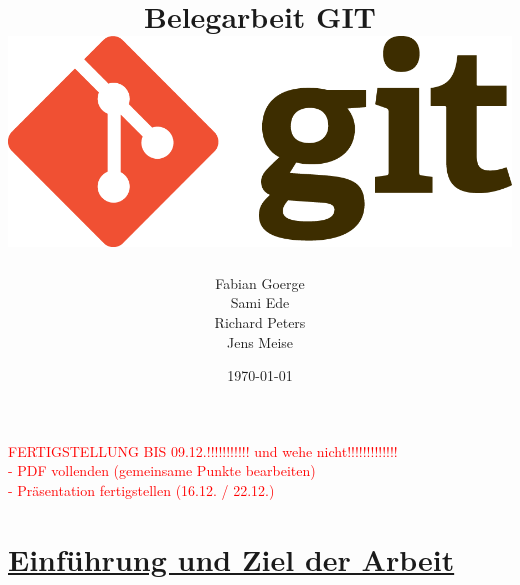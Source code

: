 \documentclass[a4paper]{article}
\begin{document}
\title{\textbf{{\Huge { Belegarbeit GIT \vspace{2cm}} 
\includegraphics[width=\textwidth]{git-logo.png} %
\vspace{2cm} }}}
\author{Fabian Goerge \\  Sami Ede  \\ Richard Peters \\ Jens Meise}
\date{\today}
\maketitle
\thispagestyle{empty} %


\newpage

\setcounter{page}{1} %
\tableofcontents	 %


\newpage

\textcolor{red}
{
	FERTIGSTELLUNG BIS 09.12.!!!!!!!!!!! 
	und wehe nicht!!!!!!!!!!!!!\\
	- PDF vollenden (gemeinsame Punkte bearbeiten)\\
	- Präsentation fertigstellen (16.12. / 22.12.)
}
\section{\underline{Einführung und Ziel der Arbeit}} %
\end{document}
